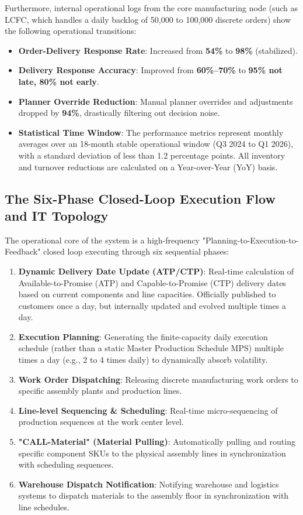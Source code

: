 \documentclass[11pt,a4paper]{article}
\begin{document}
Furthermore, internal operational logs from the core manufacturing node (such as LCFC, which handles a daily backlog of 50,000 to 100,000 discrete orders) show the following operational transitions:
\begin{itemize}
    \item \textbf{Order-Delivery Response Rate}: Increased from \textbf{54\%} to \textbf{98\%} (stabilized).
    \item \textbf{Delivery Response Accuracy}: Improved from \textbf{60\%–70\%} to \textbf{95\% not late, 80\% not early}.
    \item \textbf{Planner Override Reduction}: Manual planner overrides and adjustments dropped by \textbf{94\%}, drastically filtering out decision noise.
    \item \textbf{Statistical Time Window}: The performance metrics represent monthly averages over an 18-month stable operational window (Q3 2024 to Q1 2026), with a standard deviation of less than 1.2 percentage points. All inventory and turnover reductions are calculated on a Year-over-Year (YoY) basis.
\end{itemize}

\subsection{The Six-Phase Closed-Loop Execution Flow and IT Topology}
The operational core of the system is a high-frequency "Planning-to-Execution-to-Feedback" closed loop executing through six sequential phases:
\begin{enumerate}
    \item \textbf{Dynamic Delivery Date Update (ATP/CTP)}: Real-time calculation of Available-to-Promise (ATP) and Capable-to-Promise (CTP) delivery dates based on current components and line capacities. Officially published to customers once a day, but internally updated and evolved multiple times a day.
    \item \textbf{Execution Planning}: Generating the finite-capacity daily execution schedule (rather than a static Master Production Schedule MPS) multiple times a day (e.g., 2 to 4 times daily) to dynamically absorb volatility.
    \item \textbf{Work Order Dispatching}: Releasing discrete manufacturing work orders to specific assembly plants and production lines.
    \item \textbf{Line-level Sequencing \& Scheduling}: Real-time micro-sequencing of production sequences at the work center level.
    \item \textbf{"CALL-Material" (Material Pulling)}: Automatically pulling and routing specific component SKUs to the physical assembly lines in synchronization with scheduling sequences.
    \item \textbf{Warehouse Dispatch Notification}: Notifying warehouse and logistics systems to dispatch materials to the assembly floor in synchronization with line schedules.
\end{enumerate}
\end{document}

